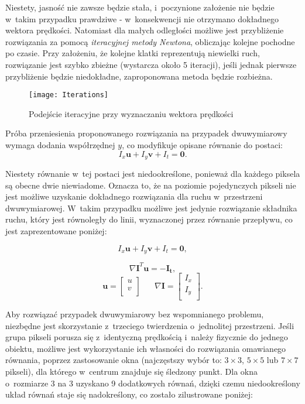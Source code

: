       Niestety, jasność nie zawsze będzie stała, i~poczynione założenie nie będzie w~takim przypadku prawdziwe - w~konsekwencji nie otrzymano dokładnego wektora prędkości. Natomiast dla małych odległości możliwe jest przybliżenie rozwiązania za pomocą \textit{iteracyjnej metody Newtona}, obliczając kolejne pochodne po czasie. Przy założeniu, że kolejne klatki reprezentują niewielki ruch, rozwiązanie jest szybko zbieżne (wystarcza około 5 iteracji), jeśli jednak pierwsze przybliżenie będzie niedokładne, zaproponowana metoda będzie rozbieżna.

        \begin{figure}[!ht]
          \centering
          \texttt{[image: Iterations]}
          \caption[Podejście iteracyjne przy wyznaczaniu wektora prędkości]{Podejście iteracyjne przy wyznaczaniu wektora prędkości}
          \label{fig:Iterations}
        \end{figure}

      Próba przeniesienia proponowanego rozwiązania na przypadek dwuwymiarowy wymaga dodania współrzędnej $y$, co modyfikuje opisane równanie do postaci: \[I_{x}\mathbf{u} + I_{y}\mathbf{v} + I_{t} = \mathbf{0}. \]

      Niestety równanie w~tej postaci jest niedookreślone, ponieważ dla każdego piksela są obecne dwie niewiadome. Oznacza to, że na poziomie pojedynczych pikseli nie jest możliwe uzyskanie dokładnego rozwiązania dla ruchu w~przestrzeni dwuwymiarowej. W~takim przypadku możliwe jest jedynie rozwiązanie składnika ruchu, który jest równoległy do linii, wyznaczonej przez równanie przepływu, co jest zaprezentowane poniżej:

        \[ I_{x}\mathbf{u} + I_{y}\mathbf{v} + I_{t} = \mathbf{0}, \]

        \[ \nabla \mathbf{I}^{T} \mathbf{u} = -\mathbf{I_{t}}, \]
        \[
          \mathbf{u} =
            \begin{bmatrix}
              u \\
              v \\
            \end{bmatrix}
          \hspace{20pt}
          \nabla \mathbf{I} =
            \begin{bmatrix}
              I_{x} \\
              I_{y} \\
            \end{bmatrix}.
        \]

      Aby rozwiązać przypadek dwuwymiarowy bez wspomnianego problemu, niezbędne jest skorzystanie z~trzeciego twierdzenia o~jednolitej przestrzeni. Jeśli grupa pikseli porusza się z~identyczną prędkością i~należy fizycznie do jednego obiektu, możliwe jest wykorzystanie ich własności do rozwiązania omawianego równania, poprzez zastosowanie okna (najczęstszy wybór to: $3\times3$, $5\times5$ lub $7\times7$ pikseli), dla którego w~centrum znajduje się śledzony punkt. Dla okna o~rozmiarze 3 na 3 uzyskano 9 dodatkowych równań, dzięki czemu niedookreślony układ równań staje się nadokreślony, co zostało zilustrowane poniżej:

